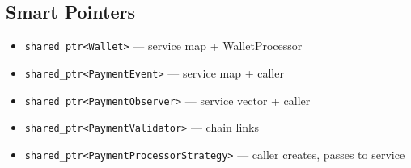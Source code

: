 \documentclass[11pt,a4paper]{article}
\begin{document}
\subsection{Smart Pointers}
\begin{itemize}
    \item \texttt{shared\_ptr<Wallet>} --- service map + WalletProcessor
    \item \texttt{shared\_ptr<PaymentEvent>} --- service map + caller
    \item \texttt{shared\_ptr<PaymentObserver>} --- service vector + caller
    \item \texttt{shared\_ptr<PaymentValidator>} --- chain links
    \item \texttt{shared\_ptr<PaymentProcessorStrategy>} --- caller creates, passes to service
\end{itemize}

\newpage
\end{document}
